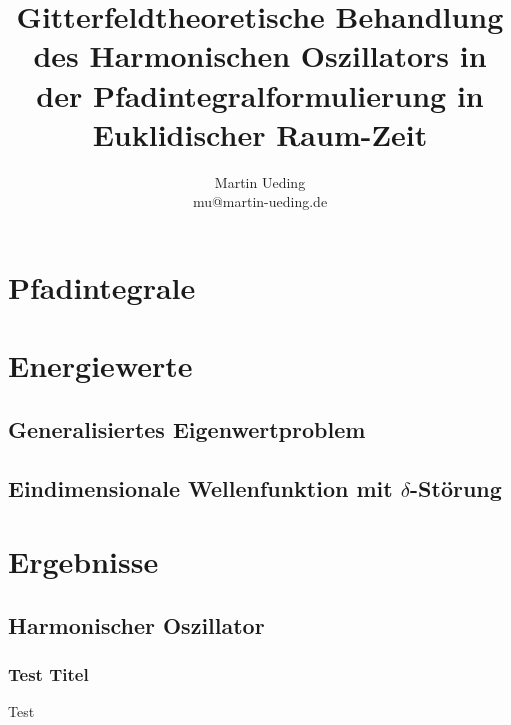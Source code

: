 \documentclass[11pt, ngerman, fleqn]{beamer}
\title{ Gitterfeldtheoretische Behandlung des Harmonischen Oszillators in der Pfadintegralformulierung in Euklidischer Raum-Zeit }
\author{
    Martin Ueding \\ mu@martin-ueding.de
}
\begin{document}
\begin{frame}
    \titlepage
\end{frame}

\begin{frame}
    \tableofcontents
\end{frame}

\section{Pfadintegrale}

\section{Energiewerte}

\subsection{Generalisiertes Eigenwertproblem}

\subsection{Eindimensionale Wellenfunktion mit $\delta$-Störung}


\section{Ergebnisse}

\subsection{Harmonischer Oszillator}

\begin{frame}
    \frametitle{Test Titel}
   Test 
\end{frame}
\end{document}
